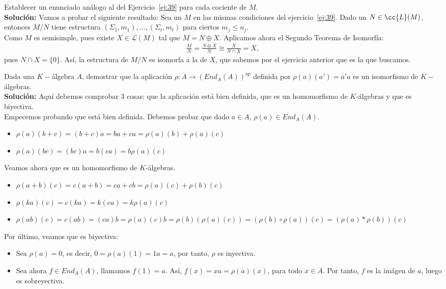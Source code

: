 \begin{ejercicio}
    Establecer un enunciado análogo al del Ejercicio~\ref{ej:39} para cada cociente de $M$. \\
    
    \noindent
    \textbf{Solución:}
    Vamos a probar el siguiente resultado: Sea un $M$ en las mismas condiciones del ejercicio~\ref{ej:39}. Dado un $N \in \cc{L}(M)$, entonces $M/N$ tiene estructura $(\Sigma_1,m_1), \ldots, (\Sigma_t,m_t)$ para ciertos $m_j\leq n_j$. \\

    Como $M$ es semisimple, pues existe $X \in \mathcal{L}(M)$ tal que $M = N \oplus X$. Aplicamos ahora el Segundo Teorema de Isomorfía: 
    \begin{gather*}
        \frac{M}{N} = \frac{N\oplus X}{N} \cong \frac{X}{N \cap X} = X,
    \end{gather*}
pues $N \cap X = \{0\}$. Así, la estructura de $M/N$ es isomorfa a la de $X$, que sabemos por el ejercicio anterior que es la que buscamos.
\end{ejercicio}


\begin{ejercicio}
    Dada una $K-$álgebra $A$, demostrar que la aplicación $\rho:A\to {(End_A(A))}^{op}$ definida por $\rho(a)(a') = a'a$ es un isomorfismo de $K-$álgebras.\\
    
    \noindent
    \textbf{Solución:}
    Aquí debemos comprobar 3 cosas: que la aplicación está bien definida, que es un homomorfismo de $K$-álgebras y que es biyectiva. \\

    Empecemos probando que está bien definida. Debemos probar que dado $a \in A$, $\rho(a) \in End_A(A)$. 
    \begin{itemize}
        \item $\rho(a)(b + c) = (b+c)a = ba + ca = \rho(a)(b) + \rho(a)(c)$
        \item $\rho(a)(bc) = (bc)a = b(ca) = b \rho(a)(c)$
    \end{itemize}
Veamos ahora que es un homomorfismo de $K$-álgebras. 
\begin{itemize}
    \item $\rho(a+b)(c) = c(a+b) = ca + cb = \rho(a)(c) + \rho(b)(c)$
    \item $\rho(ka)(c) = c(ka) = k(ca) = k\rho(a)(c)$
    \item $\rho(ab)(c)= c(ab) = (ca)b = \rho(a)(c)b = \rho(b)(\rho(a)(c)) = (\rho(b) \circ \rho(a))(c) = (\rho(a)\ast \rho(b))(c)$
\end{itemize}
Por último, veamos que es biyectiva:
\begin{itemize}
    \item Sea $\rho(a) = 0$, es decir, $0 = \rho(a)(1) = 1a = a$, por tanto, $\rho$ es inyectiva.
    \item Sea ahora $f \in End_A(A)$, llamamos $f(1) = a$. Así, $f(x) = xa = \rho(a)(x)$, para todo $x \in A$. Por tanto, $f$ es la imágen de $a$, luego es sobreyectiva.
\end{itemize}
\end{ejercicio}

